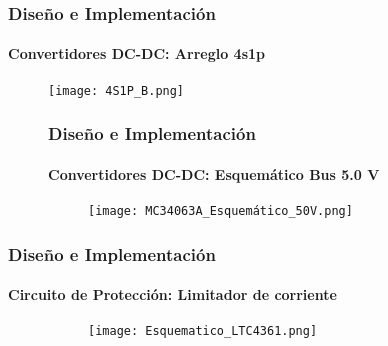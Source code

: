 \begin{frame}
    \frametitle{Diseño e Implementación}
    \framesubtitle{Convertidores DC-DC: Arreglo 4s1p}
    \begin{figure}[H]
        \centering
        \texttt{[image: 4S1P\_B.png]} %
        \label{fig:4S1P_B}
    \end{figure}
\end{frame}





\begin{figure}
    \frametitle{Diseño e Implementación}
    \framesubtitle{Convertidores DC-DC: Esquemático Bus 5.0 V}
    \begin{figure}[H]
        \centering
        \texttt{[image: MC34063A\_Esquemático\_50V.png]} %
        \label{fig:Resultado5.0}
    \end{figure}
\end{figure}


\begin{frame}
\frametitle{Diseño e Implementación}
\framesubtitle{Circuito de Protección: Limitador de corriente}
\begin{figure}
    \begin{figure}[b]
        \centering
        \texttt{[image: Esquematico\_LTC4361.png]} %
        \label{fig:Resultado6.0}
    \end{figure}
\end{figure}
\end{frame}